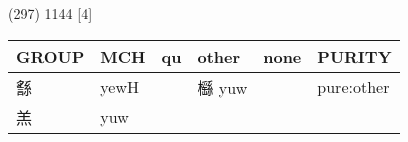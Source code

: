 \documentclass[14pt,a4paper]{scrartcl}
\begin{document}
(297) 1144 {[}4{]}

\begin{longtable}[c]{@{}llllll@{}}
\toprule
\begin{minipage}[b]{0.14\columnwidth}\raggedright\strut
GROUP
\strut\end{minipage} &
\begin{minipage}[b]{0.14\columnwidth}\raggedright\strut
MCH
\strut\end{minipage} &
\begin{minipage}[b]{0.14\columnwidth}\raggedright\strut
qu
\strut\end{minipage} &
\begin{minipage}[b]{0.14\columnwidth}\raggedright\strut
other
\strut\end{minipage} &
\begin{minipage}[b]{0.14\columnwidth}\raggedright\strut
none
\strut\end{minipage} &
\begin{minipage}[b]{0.14\columnwidth}\raggedright\strut
PURITY
\strut\end{minipage}\tabularnewline
\midrule
\endhead
\begin{minipage}[t]{0.14\columnwidth}\raggedright\strut
䌛
\strut\end{minipage} &
\begin{minipage}[t]{0.14\columnwidth}\raggedright\strut
yewH
\strut\end{minipage} &
\begin{minipage}[t]{0.14\columnwidth}\raggedright\strut
\strut\end{minipage} &
\begin{minipage}[t]{0.14\columnwidth}\raggedright\strut
櫾 yuw
\strut\end{minipage} &
\begin{minipage}[t]{0.14\columnwidth}\raggedright\strut
\strut\end{minipage} &
\begin{minipage}[t]{0.14\columnwidth}\raggedright\strut
pure:other
\strut\end{minipage}\tabularnewline
\begin{minipage}[t]{0.14\columnwidth}\raggedright\strut
羔
\strut\end{minipage} &
\begin{minipage}[t]{0.14\columnwidth}\raggedright\strut
yuw
\strut\end{minipage} &
\begin{minipage}[t]{0.14\columnwidth}\raggedright\strut
\strut\end{minipage} &

\end{longtable}
\end{document}
